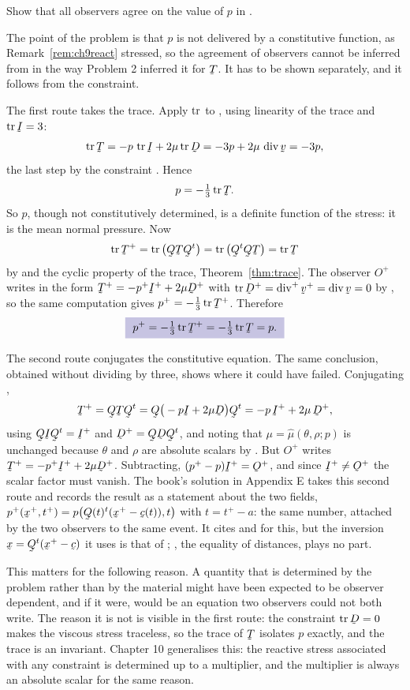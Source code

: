 \begin{problem}
Show that all observers agree on the value of $p$ in .
\end{problem}

\begin{solution}
The point of the problem is that $p$ is not delivered by a
constitutive function, as Remark~\ref{rem:ch9react} stressed, so the
agreement of observers cannot be inferred from  in the way
Problem 2 inferred it for $\bT$. It has to be shown separately, and it
follows from the constraint.

The first route takes the trace. Apply $\operatorname{tr}$ to , using
linearity of the trace and $\tr\I=3$:
\[
   \tr\bT=-p\,\tr\I+2\mu\tr\bD=-3p+2\mu\,\dvg\bv=-3p,
\]
the last step by the constraint . Hence
\[
   p=-\tfrac13\tr\bT .
\]
So $p$, though not constitutively determined, is a definite function of
the stress: it is the mean normal pressure. Now
\[
   \tr\bT^{+}=\tr\big(\bQ\bT\bQ^{t}\big)=\tr\big(\bQ^{t}\bQ\bT\big)
   =\tr\bT
\]
by  and the cyclic property of the trace,
Theorem~\ref{thm:trace}. The observer $O^{+}$ writes  in the
form $\bT^{+}=-p^{+}\I^{+}+2\mu\bD^{+}$ with $\tr\bD^{+}=\dvg^{+}\bv^{+}
=\dvg\bv=0$ by , so the same computation gives
$p^{+}=-\tfrac13\tr\bT^{+}$. Therefore
\[
   \boxed{\ p^{+}=-\tfrac13\tr\bT^{+}=-\tfrac13\tr\bT=p .\ }
\]

The second route conjugates the constitutive equation. The same
conclusion, obtained without dividing by three, shows where it could
have failed. Conjugating ,
\[
   \bT^{+}=\bQ\bT\bQ^{t}=\bQ\big(-p\I+2\mu\bD\big)\bQ^{t}
   =-p\,\I^{+}+2\mu\,\bD^{+},
\]
using $\bQ\I\bQ^{t}=\I^{+}$ and $\bD^{+}=\bQ\bD\bQ^{t}$, and noting that
$\mu=\hat\mu(\theta,\rho;p)$ is unchanged because $\theta$ and $\rho$
are absolute scalars by . But $O^{+}$ writes
$\bT^{+}=-p^{+}\I^{+}+2\mu\bD^{+}$. Subtracting,
$(p^{+}-p)\I^{+}=\Ob^{+}$, and since $\I^{+}\neq\Ob^{+}$ the scalar
factor must vanish. The book's solution in Appendix E takes this second
route and records the result as a statement about the two fields,
$p^{+}(\bx^{+},t^{+})=p\big(\bQ(t)^{t}(\bx^{+}-\bc(t)),t\big)$ with
$t=t^{+}-a$: the same number, attached by the two observers to the same
event. It cites  and  for this, but the inversion
$\bx=\bQ^{t}(\bx^{+}-\bc)$ it uses is that of ; , the
equality of distances, plays no part.

This matters for the following reason. A quantity that is determined by
the problem rather than by the material might have been expected to be
observer dependent, and if it were,  would be an equation two
observers could not both write. The reason it is not is visible in the
first route: the constraint $\tr\bD=0$ makes the viscous stress
traceless, so the trace of $\bT$ isolates $p$ exactly, and the trace is
an invariant. Chapter 10 generalises this: the reactive stress
associated with any constraint is determined up to a multiplier, and the
multiplier is always an absolute scalar for the same reason.
\end{solution}

